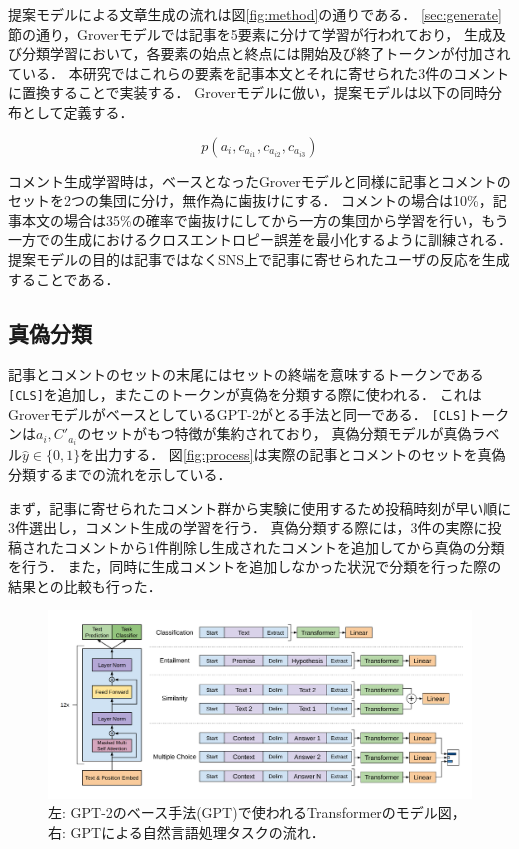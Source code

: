 提案モデルによる文章生成の流れは図\ref{fig:method}の通りである．
\ref{sec:generate}節の通り，Groverモデルでは記事を5要素に分けて学習が行われており，
生成及び分類学習において，各要素の始点と終点には開始及び終了トークンが付加されている．
本研究ではこれらの要素を記事本文とそれに寄せられた3件のコメントに置換することで実装する．
Groverモデルに倣い，提案モデルは以下の同時分布として定義する．

\begin{equation}
    \label{eq:joint_distri}
    p(a_i, c_{a_{i1}}, c_{a_{i2}}, c_{a_{i3}})
\end{equation}

コメント生成学習時は，ベースとなったGroverモデルと同様に記事とコメントのセットを2つの集団に分け，無作為に歯抜けにする．
コメントの場合は10\%，記事本文の場合は35\%の確率で歯抜けにしてから一方の集団から学習を行い，もう一方での生成におけるクロスエントロピー誤差を最小化するように訓練される\cite{DBLP:journals/corr/abs-1905-12616}．
提案モデルの目的は記事ではなくSNS上で記事に寄せられたユーザの反応を生成することである．

\subsection{真偽分類}
\label{sec:method_classify}
記事とコメントのセットの末尾にはセットの終端を意味するトークンである\texttt{[CLS]}を追加し，またこのトークンが真偽を分類する際に使われる．
これはGroverモデルがベースとしているGPT-2がとる手法\cite{Radford_GPT2}と同一である．
\texttt{[CLS]}トークンは${a_i, C'_{a_i}}$のセットがもつ特徴が集約されており，
真偽分類モデルが真偽ラベル$\hat{y} \in \{0, 1\}$を出力する．
図\ref{fig:process}は実際の記事とコメントのセットを真偽分類するまでの流れを示している．

まず，記事に寄せられたコメント群から実験に使用するため投稿時刻が早い順に3件選出し，コメント生成の学習を行う．
真偽分類する際には，3件の実際に投稿されたコメントから1件削除し生成されたコメントを追加してから真偽の分類を行う．
また，同時に生成コメントを追加しなかった状況で分類を行った際の結果との比較も行った．

\begin{figure}[h]
    \centering
    \includegraphics[width=\linewidth,pagebox=cropbox,clip]{figures/fig_gpt.pdf}
    \caption{左: GPT-2のベース手法(GPT)で使われるTransformerのモデル図，右: GPTによる自然言語処理タスクの流れ\cite{radford2018improving}．}
    \label{fig:gpt}
\end{figure}

